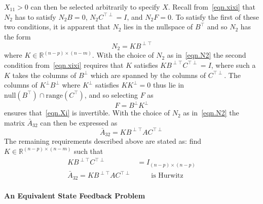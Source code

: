$X_{11}>0$ can then be selected arbitrarily to specify $X$.
Recall from\ \eqref{eqn.xixi} that $N_{2}$ has to satisfy $N_{2}B=0$, $N_{2}C^{\top\perp}=I$, and $N_{2}F=0$.
To satisfy the first of these two conditions, it is apparent that $N_{2}$ lies in the nullspace of $B^{\top}$ and so $N_{2}$ has the form
\begin{equation}
  \label{eqn.N2}
  N_{2}=KB^{\perp\top}
\end{equation}
where $K\in\mathbb{R}^{(n-p)\times(n-m)}$.
With the choice of $N_{2}$ as in\ \eqref{eqn.N2} the second condition from\ \eqref{eqn.xixi} requires that $K$ satisfies $KB^{\perp\top}C^{\top\perp} = I$, where such a $K$ takes the columns of $B^{\perp}$ which are spanned by the columns of $C^{\top\perp}$.
The columns of $K^{\perp}B^{\perp}$ where $K^{\perp}$ satisfies $KK^{\perp}=0$ thus lie in $\text{null}(B^{\top})\cap\text{range}(C^{\top})$, and so selecting $F$ as
\begin{equation}
  \label{eqn.FF}
  F = B^{\perp}K^{\perp}
\end{equation}
ensures that\ \eqref{eqn.Xi} is invertible.
With the choice of $N_{2}$ as in\ \eqref{eqn.N2} the matrix $\bar{A}_{32}$ can then be expressed as
\begin{equation*}
  \bar{A}_{32}=KB^{\perp\top}AC^{\top\perp}
\end{equation*}
The remaining requirements described above are stated as: find $K\in\mathbb{R}^{(n-p)\times(n-m)}$ such that
\begin{align}
  \label{eqn.Kgeninv}
  KB^{\perp\top}C^{\top\perp}&=I_{(n-p)\times(n-p)} \\
  \label{eqn.eigK}
  \bar{A}_{32}=KB^{\perp\top}AC^{\top\perp}&\qquad\text{is Hurwitz}
\end{align}

\paragraph{An Equivalent State Feedback Problem}

